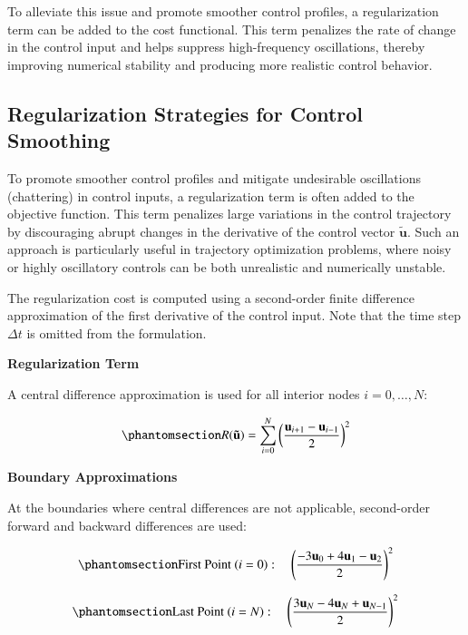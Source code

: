 \documentclass[
  number,
  preprint]{elsarticle}
\begin{document}
To alleviate this issue and promote smoother control profiles, a
regularization term can be added to the cost functional. This term
penalizes the rate of change in the control input and helps suppress
high-frequency oscillations, thereby improving numerical stability and
producing more realistic control behavior.

\subsection{Regularization Strategies for Control
Smoothing}\label{regularization-strategies-for-control-smoothing}

To promote smoother control profiles and mitigate undesirable
oscillations (chattering) in control inputs, a regularization term
\citep{sanchez2016optimal} is often added to the objective function.
This term penalizes large variations in the control trajectory by
discouraging abrupt changes in the derivative of the control vector
\(\mathbf{\tilde{u}}\). Such an approach is particularly useful in
trajectory optimization problems, where noisy or highly oscillatory
controls can be both unrealistic and numerically unstable.

The regularization cost is computed using a second-order finite
difference approximation of the first derivative of the control input.
Note that the time step \(\Delta t\) is omitted from the formulation.

\textbf{Regularization Term}

A central difference approximation is used for all interior nodes
\(i = 0, \dots, N\):

\begin{equation}\protect\phantomsection\label{eq-ch2-central-diff-reg}{
R(\mathbf{\tilde{u}}) = \sum_{i=0}^{N} \left( \frac{\mathbf{{u}}_{i+1} - \mathbf{u}_{i-1}}{2} \right)^2
}\end{equation}

\textbf{Boundary Approximations}

At the boundaries where central differences are not applicable,
second-order forward and backward differences are used:

\begin{equation}\protect\phantomsection\label{eq-ch2-forward-diff}{
\text{First Point } (i = 0): \quad \left( \frac{-3\mathbf{u}_0 + 4\mathbf{u}_1 - \mathbf{u}_2}{2} \right)^2
}\end{equation}

\begin{equation}\protect\phantomsection\label{eq-ch2-backward-diff}{
\text{Last Point } (i = N): \quad \left( \frac{3\mathbf{u}_{N} - 4\mathbf{u}_N + \mathbf{u}_{N-1}}{2} \right)^2
}\end{equation}
\end{document}

